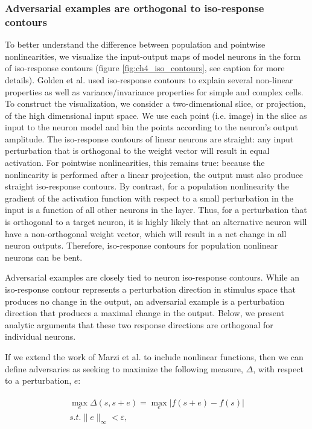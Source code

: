 \subsubsection{Adversarial examples are orthogonal to iso-response contours}
To better understand the difference between population and pointwise nonlinearities, we visualize the input-output maps of model neurons in the form of iso-response contours (figure \ref{fig:ch4_iso_contours}, see caption for more details). Golden et al. \citeyearpar{golden2016conjectures} used iso-response contours to explain several non-linear properties as well as variance/invariance properties for simple and complex cells. To construct the visualization, we consider a two-dimensional slice, or projection, of the high dimensional input space. We use each point (i.e. image) in the slice as input to the neuron model and bin the points according to the neuron's output amplitude. The iso-response contours of linear neurons are straight: any input perturbation that is orthogonal to the weight vector will result in equal activation. For pointwise nonlinearities, this remains true: because the nonlinearity is performed after a linear projection, the output must also produce straight iso-response contours. By contrast, for a population nonlinearity the gradient of the activation function with respect to a small perturbation in the input is a function of all other neurons in the layer. Thus, for a perturbation that is orthogonal to a target neuron, it is highly likely that an alternative neuron will have a non-orthogonal weight vector, which will result in a net change in all neuron outputs. Therefore, iso-response contours for population nonlinear neurons can be bent.

Adversarial examples are closely tied to neuron iso-response contours. While an iso-response contour represents a perturbation direction in stimulus space that produces no change in the output, an adversarial example is a perturbation direction that produces a maximal change in the output. Below, we present analytic arguments that these two response directions are orthogonal for individual neurons.

If we extend the work of Marzi et al. \citeyearpar{marzi2018sparsity} to include nonlinear functions, then we can define adversaries as seeking to maximize the following measure, $\Delta$, with respect to a perturbation, $e$:

\begin{align}\label{eq:ch4_adv_metric}
\begin{split}
    \max_{e} \Delta (s, s+e) = \max_{e} |f(s+e) - f(s)| \\
    s.t. \|e\|_{\infty} < \varepsilon,
\end{split}
\end{align}

